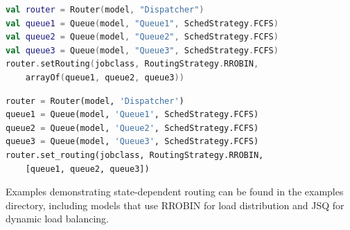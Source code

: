 \begin{KOTLIN}
\begin{lstlisting}[language = kotlin, basicstyle=\ttfamily\scriptsize]
val router = Router(model, "Dispatcher")
val queue1 = Queue(model, "Queue1", SchedStrategy.FCFS)
val queue2 = Queue(model, "Queue2", SchedStrategy.FCFS)
val queue3 = Queue(model, "Queue3", SchedStrategy.FCFS)
router.setRouting(jobclass, RoutingStrategy.RROBIN,
    arrayOf(queue1, queue2, queue3))
\end{lstlisting}
\end{KOTLIN}
\begin{PYTHON}
\begin{lstlisting}[language = python]
router = Router(model, 'Dispatcher')
queue1 = Queue(model, 'Queue1', SchedStrategy.FCFS)
queue2 = Queue(model, 'Queue2', SchedStrategy.FCFS)
queue3 = Queue(model, 'Queue3', SchedStrategy.FCFS)
router.set_routing(jobclass, RoutingStrategy.RROBIN,
    [queue1, queue2, queue3])
\end{lstlisting}
\end{PYTHON}
Examples demonstrating state-dependent routing can be found in the examples directory, including models that use RROBIN for load distribution and JSQ for dynamic load balancing.

